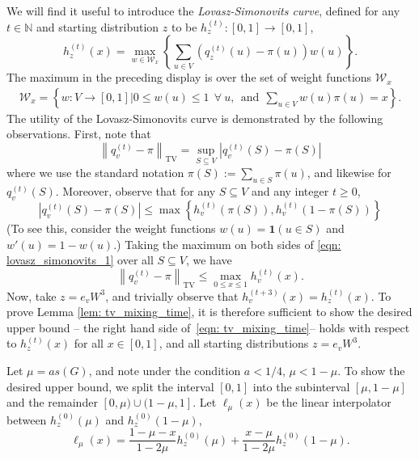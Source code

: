\documentclass[11pt,twoside]{article}
\newcommand{\set}[1]{\left\{#1\right\}}
\newcommand{\abs}[1]{\left \lvert #1 \right \rvert}
\newcommand{\norm}[1]{\left\lVert#1\right\rVert}
\newcommand{\1}{\mathbf{1}}
\begin{document}
We will find it useful to introduce the \emph{Lovasz-Simonovits curve}, defined for any $t \in \mathbb{N}$ and starting distribution $z$ to be $h_z^{(t)}: [0,1] \to [0,1]$,
\begin{equation*}
h_z^{(t)}(x) = \max_{w \in \mathcal{W}_x} \left\{ \sum_{u \in V} \left(q_z^{(t)}(u) - \pi(u)\right)w(u)\right\}.
\end{equation*}
The maximum in the preceding display is over the set of weight functions $\mathcal{W}_{x}$
\begin{align*}
\mathcal{W}_x = \left\{w: V \to [0,1] \Big\vert 0 \leq w(u) \leq 1~~\forall~u,~~\text{and}~~\sum_{u \in V} w(u) \pi(u) = x\right\}.
\end{align*}
The utility of the Lovasz-Simonovits curve is demonstrated by the following observations. First, note that
\begin{equation*}
\norm{q_v^{(t)} - \pi}_{\mathrm{TV}} = \sup_{S \subseteq V} \abs{q_v^{(t)}(S) - \pi(S)}
\end{equation*}
where we use the standard notation $\pi(S) := \sum_{u \in S} \pi(u)$, and likewise for $q_v^{(t)}(S)$. Moreover, observe that for any $S \subseteq V$ and any integer $t \geq 0$,
\begin{equation}
\label{eqn: lovasz_simonovits_1}
\abs{q_v^{(t)}(S) - \pi(S)} \leq \max \set{h_v^{(t)}(\pi(S)), h_v^{(t)}(1 - \pi(S))}
\end{equation}
(To see this, consider the weight functions $w(u) = \1(u \in S)$ and $w'(u) = 1 - w(u)$.) Taking the maximum on both sides of \eqref{eqn: lovasz_simonovits_1}  over all $S \subseteq V$, we have
\begin{equation*}
\norm{q_v^{(t)} - \pi}_{\mathrm{TV}} \leq \max_{0 \leq x \leq 1} h_v^{(t)}(x).
\end{equation*}
Now, take $z = e_vW^3$, and trivially observe that $h_v^{(t+3)}(x) = h_z^{(t)}(x)$. To prove Lemma \ref{lem: tv_mixing_time}, it is therefore sufficient to show the desired upper bound -- the right hand side of~\eqref{eqn: tv_mixing_time}-- holds with respect to $h_z^{(t)}(x)$ for all $x \in [0,1]$, and all starting distributions $z = e_vW^3$. 

Let $\mu = as(G)$, and note under the condition $a < 1/4$, $\mu < 1 - \mu$. To show the desired upper bound, we split the interval $[0,1]$ into the subinterval $[\mu, 1 - \mu]$ and the remainder $[0,\mu) \cup (1 - \mu, 1]$. Let $\ell_{\mu}(x)$ be the linear interpolator between $h_z^{(0)}(\mu)$ and $h_z^{(0)}(1 - \mu)$, 
\begin{equation*}
\ell_{\mu}(x) = \frac{1 - \mu - x}{1 - 2\mu} h_z^{(0)}(\mu) + \frac{x - \mu}{1 - 2\mu}h_z^{(0)}(1 - \mu).
\end{equation*}
\end{document}
